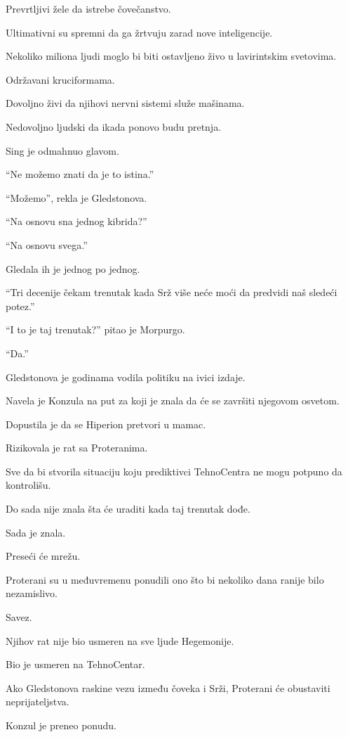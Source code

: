 Prevrtljivi žele da istrebe čovečanstvo.

Ultimativni su spremni da ga žrtvuju zarad nove inteligencije.

Nekoliko miliona ljudi moglo bi biti ostavljeno živo u lavirintskim svetovima.

Održavani kruciformama.

Dovoljno živi da njihovi nervni sistemi služe mašinama.

Nedovoljno ljudski da ikada ponovo budu pretnja.

\bigskip

Sing je odmahnuo glavom.

``Ne možemo znati da je to istina.''

``Možemo'', rekla je Gledstonova.

``Na osnovu sna jednog kibrida?''

``Na osnovu svega.''

Gledala ih je jednog po jednog.

``Tri decenije čekam trenutak kada Srž više neće moći da predvidi naš sledeći potez.''

``I to je taj trenutak?'' pitao je Morpurgo.

``Da.''

\bigskip

Gledstonova je godinama vodila politiku na ivici izdaje.

Navela je Konzula na put za koji je znala da će se završiti njegovom osvetom.

Dopustila je da se Hiperion pretvori u mamac.

Rizikovala je rat sa Proteranima.

Sve da bi stvorila situaciju koju prediktivci TehnoCentra ne mogu potpuno da kontrolišu.

Do sada nije znala šta će uraditi kada taj trenutak dođe.

Sada je znala.

Preseći će mrežu.

\bigskip

Proterani su u međuvremenu ponudili ono što bi nekoliko dana ranije bilo nezamislivo.

Savez.

Njihov rat nije bio usmeren na sve ljude Hegemonije.

Bio je usmeren na TehnoCentar.

Ako Gledstonova raskine vezu između čoveka i Srži, Proterani će obustaviti neprijateljstva.

Konzul je preneo ponudu.

